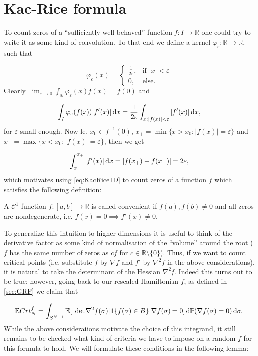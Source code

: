 \section{Kac-Rice formula}
To count zeros of a ``sufficiently well-behaved'' function $f:I\rightarrow\mathbb R$ one could try to write it as some kind of convolution. To that end we define a kernel $\varphi_\varepsilon:\mathbb R\rightarrow\mathbb R$, such that

$$
\varphi_\varepsilon(x) = \begin{cases}
	\frac{1}{2\varepsilon}, &\mbox{if } |x|<\varepsilon \\
		0, &\mbox{else.}
\end{cases}$$
Clearly $\lim_{\varepsilon\rightarrow 0}\int_\mathbb{R}\varphi_\varepsilon(x)f(x)=f(0)$ and 

\begin{equation}\label{eq:KacRice1D}
	\int_I \varphi_\varepsilon(f(x))|f'(x)|\mathop{}\!\mathrm{d} x = \frac{1}{2\varepsilon}\int_{x:|f(x)|<\varepsilon}|f'(x)|\mathop{}\!\mathrm{d} x,
\end{equation}
for $\varepsilon$ small enough. Now let $x_0\in f^{-1}(0)$, $x_+=\min\{x>x_0: |f(x)|=\varepsilon\}$ and $x_-=\max\{x<x_0: |f(x)|=\varepsilon\}$, then we get

$$\int_{x_-}^{x_+}|f'(x)|\mathop{}\!\mathrm{d} x = |f(x_+)-f(x_-)|=2\varepsilon,$$
which motivates using \eqref{eq:KacRice1D} to count zeros of a function $f$ which satisfies the following definition:
\begin{definition}
	A $\mathcal C^1$ function $f:[a,b]\rightarrow\mathbb R$ is called convenient if $f(a),f(b)\neq 0$ and all zeros are nondegenerate, i.e. $f(x)=0\implies f'(x)\neq 0$.
\end{definition}

To generalize this intuition to higher dimensions it is useful to think of the derivative factor as some kind of normalisation of the ``volume'' around the root ($f$ has the same number of zeros as $cf$ for $c\in\mathbb R\setminus\{0\}$). Thus, if we want to count critical points (i.e. substitute $f$ by $\nabla f$ and $f'$ by $\nabla^2 f$ in the above considerations), it is natural to take the determinant of the Hessian $\nabla^2 f$. Indeed this turns out to be true; however, going back to our rescaled Hamiltonian $f$, as defined in \ref{sec:GRF} we claim that

\begin{equation}\label{eq:KacRiceSN}
	\mathbb E Crt_N^f = \int_{S^{N-1}}\mathbb E[|\det\nabla^2f(\sigma)|\mathbf 1\{f(\sigma)\in B\}|\nabla f(\sigma)=0]\mathop{}\!\mathrm{d}\mathbb P(\nabla f(\sigma)=0)\mathop{}\!\mathrm{d}\sigma.
\end{equation}
While the above considerations motivate the choice of this integrand, it still remains to be checked what kind of criteria we have to impose on a random $f$ for this formula to hold. We will formulate these conditions in the following lemma:

